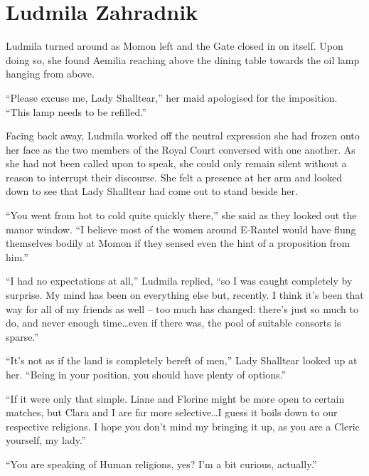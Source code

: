\chapter{Ludmila Zahradnik}


Ludmila turned around as Momon left and the Gate closed in on itself. Upon doing so, she found Aemilia reaching above the dining table towards the oil lamp hanging from above.

 

“Please excuse me, Lady Shalltear,” her maid apologised for the imposition. “This lamp needs to be refilled.”

 

Facing back away, Ludmila worked off the neutral expression she had frozen onto her face as the two members of the Royal Court conversed with one another. As she had not been called upon to speak, she could only remain silent without a reason to interrupt their discourse. She felt a presence at her arm and looked down to see that Lady Shalltear had come out to stand beside her.

 

“You went from hot to cold quite quickly there,” she said as they looked out the manor window. “I believe most of the women around E-Rantel would have flung themselves bodily at Momon if they sensed even the hint of a proposition from him.”

 

“I had no expectations at all,” Ludmila replied, “so I was caught completely by surprise. My mind has been on everything else but, recently. I think it’s been that way for all of my friends as well – too much has changed: there’s just so much to do, and never enough time…even if there was, the pool of suitable consorts is sparse.”

 

“It’s not as if the land is completely bereft of men,” Lady Shalltear looked up at her. “Being in your position, you should have plenty of options.”

 

“If it were only that simple. Liane and Florine might be more open to certain matches, but Clara and I are far more selective…I guess it boils down to our respective religions. I hope you don’t mind my bringing it up, as you are a Cleric yourself, my lady.”

 

“You are speaking of Human religions, yes? I’m a bit curious, actually.”

 

